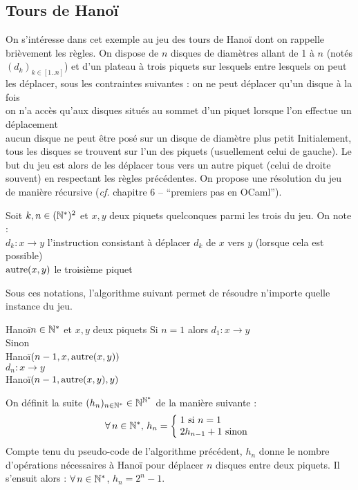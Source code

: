 	\subsection{Tours de Hanoï}
		
		On s'intéresse dans cet exemple au jeu des tours de Hanoï dont on rappelle brièvement les règles. \nt
		On dispose de \(n\) disques de diamètres allant de 1 à \(n\) (notés \((d_k)_{k\in[1..n]}\)) et d'un plateau à trois piquets sur lesquels entre lesquels on peut les déplacer, sous les contraintes suivantes : \nt
			 \bdot on ne peut déplacer qu'un disque à la fois \\
			 \bdot on n'a accès qu'aux disques situés au sommet d'un piquet lorsque l'on effectue un déplacement \\
			 \bdot aucun disque ne peut être posé sur un disque de diamètre plus petit \nt
		Initialement, tous les disques se trouvent sur l'un des piquets (usuellement celui de gauche). Le but du jeu est alors de les déplacer tous vers un autre piquet (celui de droite souvent) en respectant les règles précédentes. \nll
		On propose une résolution du jeu de manière récursive (\emph{cf.} chapitre 6 -- ``premiers pas en OCaml'').
		
		\begin{Notations}
		Soit \(k,n\in(\bb{N}^*)^2\) et \(x,y\) deux piquets quelconques parmi les trois du jeu. On note : \\
			 \bdot \(d_k : x \rightarrow y\) l'instruction consistant à déplacer \(d_k\) de \(x\) vers \(y\) (lorsque cela est possible) \\
			 \bdot \(\rm{autre}(x,y)\) le troisième piquet
		\end{Notations}
		
		Sous ces notations, l'algorithme suivant permet de résoudre n'importe quelle instance du jeu. \pagebreak
			
			\begin{algo}{Hanoï}{\(n\in\bb{N}^*\) et \(x,y\) deux piquets}{}
				Si \(n=1\) alors
					\(d_1 : x \to y\) \\
				Sinon \\ \Indp
					\textsf{Hanoï}\((n-1,x,\rm{autre}(x,y))\) \\
					\(d_n : x \to y\) \\
					\textsf{Hanoï}\((n-1,\rm{autre}(x,y),y)\)
			\end{algo}
		
		\eqskip{3mm}		
		\begin{Propriete}
			On définit la suite \((h_n)_{n\in\bb{N}^*} \in \bb{N}^{\bb{N}^*}\) de la manière suivante :
				\[
					\forall\,n\in\bb{N}^*,\, h_n = \left\{ \!\!\begin{tabular}{l}
					\(1\) si \(n = 1\) \\
					\(2h_{n-1} + 1\) sinon
					\end{tabular} \right.
				\]
			Compte tenu du pseudo-code de l'algorithme précédent, \(h_n\) donne le nombre d'opérations nécessaires à \textsf{Hanoï} pour déplacer \(n\) disques entre deux piquets. \nt
			Il s'ensuit alors : \(\forall\,n\in\bb{N}^*\), \(h_n = 2^n-1\).
		\end{Propriete}
		
